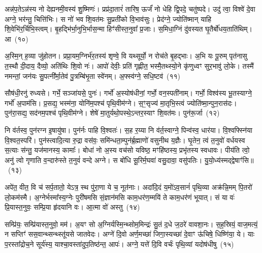 {\anuvakamend[{तृ॒तीये᳚ त्वा॒ गर्भ॒ आ य॑वि॒ष्ठा यच्च॒त्वारि॑ च}]}%

अन्न॑प॒ते\-ऽन्न॑स्य नो देह्यनमी॒वस्य॑ शु॒ष्मिणः॑। प्रप्र॑दा॒तारं॑ तारिष॒ ऊर्जं॑ नो धेहि द्वि॒पदे॒ चतु॑ष्पदे। उदु॑ त्वा॒ विश्वे॑ दे॒वा अग्ने॒ भर॑न्तु॒ चित्ति॑भिः। स नो॑ भव शि॒वत॑मः सु॒प्रती॑को वि॒भाव॑सुः। प्रेद॑ग्ने॒ ज्योति॑ष्मान् याहि शि॒वेभि॑र॒र्चिभि॒स्त्वम्। बृ॒हद्भि॑र्भा॒नुभि॒र्भास॒न्मा हिꣳ॑सीस्त॒नुवा᳚ प्र॒जाः। स॒मिधा॒ग्निं दु॑वस्यत घृ॒तैर्बो॑धय॒ताति॑थिम्। आ~(१०)

अ॒स्मि॒न् ह॒व्या जु॑होतन। प्रप्रा॒यम॒ग्निर्भ॑र॒तस्य॑ शृण्वे॒ वि यथ्सूर्यो॒ न रोच॑ते बृ॒हद्भाः। अ॒भि यः पू॒रुम् पृत॑नासु त॒स्थौ दी॒दाय॒ दैव्यो॒ अति॑थिः शि॒वो नः॑। आपो॑ देवीः॒ प्रति॑ गृह्णीत॒ भस्मै॒तथ्स्यो॒ने कृ॑णुध्वꣳ सुर॒भावु॑ लो॒के। तस्मै॑ नमन्तां॒ जन॑यः सु॒पत्नी᳚र्मा॒तेव॑ पु॒त्रम्बि॑भृ॒ता स्वे॑नम्। अ॒फ्स्व॑ग्ने॒ सधि॒ष्टव॑~(११)

सौष॑धी॒रनु॑ रुध्यसे। गर्भे॒ सञ्जा॑यसे॒ पुनः॑। गर्भो॑ अ॒स्योष॑धीनां॒ गर्भो॒ वन॒स्पती॑नाम्। गर्भो॒ विश्व॑स्य भू॒तस्याग्ने॒ गर्भो॑ अ॒पाम॑सि। प्र॒सद्य॒ भस्म॑ना॒ योनि॑म॒पश्च॑ पृथि॒वीम॑ग्ने। स॒ꣳ॒सृज्य॑ मा॒तृभि॒स्त्वं ज्योति॑ष्मा॒न्पुन॒रास॑दः। पुन॑रा॒सद्य॒ सद॑नम॒पश्च॑ पृथि॒वीम॑ग्ने। शेषे॑ मा॒तुर्यथो॒पस्थे॒\-ऽन्तर॒स्याꣳ शि॒वत॑मः। पुन॑रू॒र्जा~(१२)

नि व॑र्तस्व॒ पुन॑रग्न इ॒षायु॑षा। पुन॑र्नः पाहि वि॒श्वतः॑। स॒ह र॒य्या नि व॑र्त॒स्वाग्ने॒ पिन्व॑स्व॒ धार॑या। वि॒श्वफ्स्नि॑या वि॒श्वत॒स्परि॑। पुन॑स्त्वादि॒त्या रु॒द्रा वस॑वः॒ समि॑न्धता॒म्पुन॑र्ब्र॒ह्माणो॑ वसुनीथ य॒ज्ञैः। घृ॒तेन॒ त्वं त॒नुवो॑ वर्धयस्व स॒त्याः स॑न्तु॒ यज॑मानस्य॒ कामाः᳚। बोधा॑ नो अ॒स्य वच॑सो यविष्ठ॒ मꣳहि॑ष्ठस्य॒ प्रभृ॑तस्य स्वधावः। पीय॑ति त्वो॒ अनु॑ त्वो गृणाति व॒न्दारु॑स्ते त॒नुवं॑ वन्दे अग्ने। स बो॑धि सू॒रिर्म॒घवा॑ वसु॒दावा॒ वसु॑पतिः। यु॒यो॒ध्य॑स्मद्द्वेषाꣳ॑सि॥~(१३)

{\anuvakamend[{आ तवो॒र्जा\-ऽनु॒ षोड॑श च}]}%

अपे॑त॒ वीत॒ वि च॑ सर्प॒तातो॒ ये\-ऽत्र॒ स्थ पु॑रा॒णा ये च॒ नूत॑नाः। अदा॑दि॒दं य॒मो॑\-ऽव॒सानं॑ पृथि॒व्या अक्र॑न्नि॒मम् पि॒तरो॑ लो॒कम॑स्मै। अ॒ग्नेर्भस्मा᳚स्य॒ग्नेः पुरी॑षमसि सं॒ज्ञान॑मसि काम॒धर॑ण॒म्मयि॑ ते काम॒धर॑णं भूयात्। सं या वः॑ प्रि॒यास्त॒नुवः॒ सम्प्रि॒या हृ॑दयानि वः। आ॒त्मा वो॑ अस्तु~(१४)

सम्प्रि॑यः॒ सम्प्रि॑यास्त॒नुवो॒ मम॑। अ॒यꣳ सो अ॒ग्निर्यस्मि॒न्थ्सोम॒मिन्द्रः॑ सु॒तं द॒धे ज॒ठरे॑ वावशा॒नः। स॒ह॒स्रियं॒ वाज॒मत्यं॒ न सप्तिꣳ॑ सस॒वान्थ्सन्थ्स्तू॑यसे जातवेदः। अग्ने॑ दि॒वो अर्ण॒मच्छा॑ जिगा॒स्यच्छा॑ दे॒वाꣳ ऊ॑चिषे॒ धिष्णि॑या॒ ये। याः प॒रस्ता᳚द्रोच॒ने सूर्य॑स्य॒ याश्चा॒वस्ता॑दुप॒तिष्ठ॑न्त॒ आपः॑। अग्ने॒ यत्ते॑ दि॒वि वर्चः॑ पृथि॒व्यां यदोष॑धीषु~(१५)

